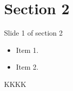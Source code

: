 \section{Section 2}



\begin{frame}{Slide 1 of section 2}
  \begin{itemize}
    \item Item 1.
    \item Item 2.
  \end{itemize}
  KKKK
\end{frame}
